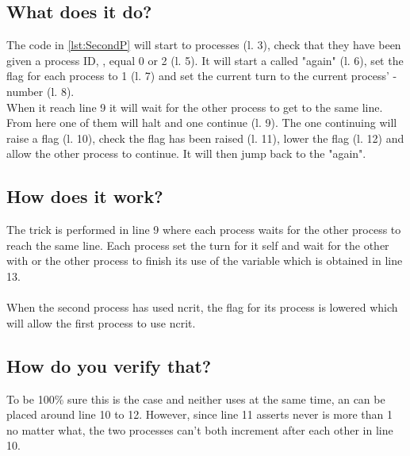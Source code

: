 \documentclass[Main]{subfiles}
\begin{document}
\subsection{What does it do?}
The code in \codeTitle \ref{lst:SecondP} will start to processes (l. 3), check that they have been given a process ID, , equal 0 or 2 (l. 5).
It will start a  called "again" (l. 6), set the flag for each process to 1 (l. 7) and set the current turn to the current process' -number (l. 8).
\\
When it reach line 9 it will wait for the other process to get to the same line.
From here one of them will halt and one continue (l. 9).
The one continuing will raise a flag (l. 10), check the flag has been raised (l. 11), lower the flag (l. 12) and allow the other process to continue.
It will then jump back to the  "again".




\subsection*{How does it work?}

The  trick is performed in line 9 where each process waits for the other process to reach the same line.
Each process set the turn for it self and wait for the other with  or the other process to finish its use of the variable  which is obtained in line 13.
\\
\\
When the second process has used ncrit, the flag for its process is lowered which will allow the first process to use ncrit.

\subsection*{How do you verify that?}
To be 100\% sure this is the case and neither uses  at the same time, an  can be placed around line 10 to 12.
However, since line 11 asserts  never is more than 1 no matter what, the two processes can't both increment after each other in line 10.
\end{document}
